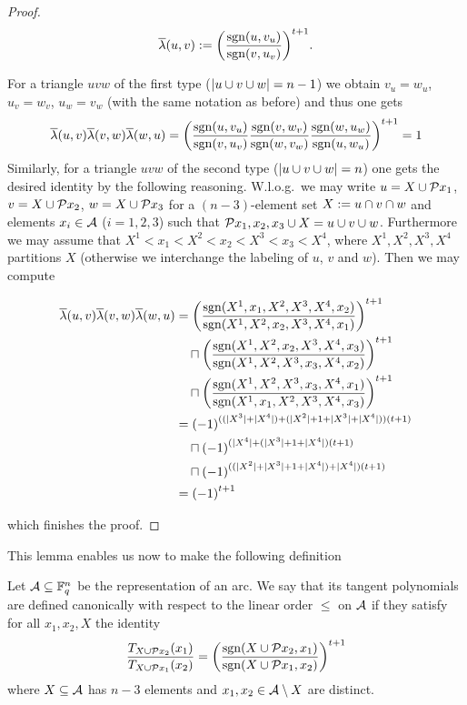 \begin{proof}
    $$
    \overline{\lambda}(u,v):={\left(\frac{\mathop\mathrm{sgn}(u,v_u)}{\mathop\mathrm{sgn}(v,u_v)}\right)}^{t+1}\text{.}
    $$
    
    For a triangle $uvw$ of the first type ($\left|u\cup v\cup w\right|=n-1$) we obtain $v_u=w_u$, $u_v=w_v$, $u_w=v_w$ (with the same notation as before) and thus one gets
    $$
    \overline{\lambda}(u,v)\overline{\lambda}(v,w)\overline{\lambda}(w,u) ={\left(\frac{\mathop\mathrm{sgn}(u,v_u)}{\mathop\mathrm{sgn}(v,u_v)}\frac{\mathop\mathrm{sgn}(v,w_v)}{\mathop\mathrm{sgn}(w,v_w)}\frac{\mathop\mathrm{sgn}(w,u_w)}{\mathop\mathrm{sgn}(u,w_u)}\right)}^{t+1}\\
    =1
    $$
    Similarly, for a triangle $uvw$ of the second type ($\left|u\cup v\cup w\right|=n$) one gets the desired identity by the following reasoning. W.l.o.g.\ we may write $u=X\setjoin\set{x_1}$, $v=X\setjoin\set{x_2}$, $w=X\setjoin\set{x_3}$ for a $(n-3)$-element set $X:=u\cap v\cap w$ and elements $x_i\in \mathcal{A}$ ($i=1,2,3$) such that $\set{x_1,x_2,x_3}\setjoin X=u\setjoin v\setjoin w$. Furthermore we may assume that $X^1<x_1<X^2<x_2<X^3<x_3<X^4$, where $X^1,X^2,X^3,X^4$ partitions $X$ (otherwise we interchange the labeling of $u$, $v$ and $w$). Then we may compute

    \begin{align*}
        \bar{\lambda}(u,v)\bar{\lambda}(v,w)\bar{\lambda}(w,u) 
 & = \left(\frac{\sgn(X^1,x_1,X^2,X^3,X^4,x_2)}{\sgn(X^1,X^2,x_2,X^3,X^4,x_1)}\right)^{t+1}              \\
 & \quad\setprod \left(\frac{\sgn(X^1,X^2,x_2,X^3,X^4,x_3)}{\sgn(X^1,X^2,X^3,x_3,X^4,x_2)}\right)^{t+1} \\
 & \quad\setprod \left(\frac{\sgn(X^1,X^2,X^3,x_3,X^4,x_1)}{\sgn(X^1,x_1,X^2,X^3,X^4,x_3)}\right)^{t+1} \\
 & = {(-1)}^{((|X^3|+|X^4|)+(|X^2|+1+|X^3|+|X^4|))(t+1)}                                                 \\
 & \quad\setprod {(-1)}^{(|X^4|+(|X^3|+1+|X^4|)(t+1)}                                                   \\
 & \quad\setprod {(-1)}^{((|X^2|+|X^3|+1+|X^4|)+|X^4|)(t+1)}                                            \\
 & = {(-1)}^{t+1}
\end{align*}

  which finishes the proof.
\end{proof}

This lemma enables us now to make the following definition

\begin{definition}
    Let $\mathcal{A}\subseteq\mathbb{F}_{q}^n$ be the representation of an arc. We say that its tangent polynomials are defined canonically with respect to the linear order $\leq$ on $\mathcal{A}$ if they satisfy for all $x_1,x_2,X$ the identity
    $$
    \frac{T_{X\setjoin\set{x_2}}(x_1)}{T_{X\setjoin\set{x_1}}(x_2)} = {\left(\frac{\sgn(X\setjoin\set{x_2},x_1)}{\sgn(X\setjoin\set{x_1},x_2)}\right)}^{t+1}
    $$
    where $X\subseteq \mathcal{A}$ has $n-3$ elements and $x_1,x_2\in \mathcal{A}\setminus X$ are distinct.
\end{definition}

